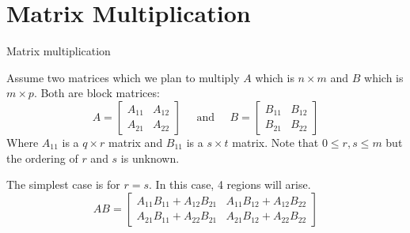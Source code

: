 \section{Matrix Multiplication}

Matrix multiplication


Assume two matrices which we plan to multiply $A$ which is $n \times m$ and $B$ which is $m \times p$.
Both are block matrices:
\begin{equation}
	A = \left[ \begin{array}{cc} A_{11} & A_{12} \\ A_{21} & A_{22} \end{array} \right]
	\;\;\;\;\; \text{and} \;\;\;\;\;
	B = \left[ \begin{array}{cc} B_{11} & B_{12} \\ B_{21} & B_{22} \end{array} \right]
\end{equation}
Where $A_{11}$ is a $q \times r$ matrix and $B_{11}$ is a $s \times t$ matrix.
Note that $0 \leq r , s \leq m$ but the ordering of $r$ and $s$ is unknown.

The simplest case is for $r=s$.
In  this case, 4 regions will arise.
\begin{equation}
	AB = \left[ \begin{array}{cc} 
		A_{11}B_{11}+A_{12}B_{21} & A_{11}B_{12}+A_{12}B_{22} \\ 
		A_{21}B_{11}+A_{22}B_{21} & A_{21}B_{12}+A_{22}B_{22}
	\end{array} \right]
\end{equation}



